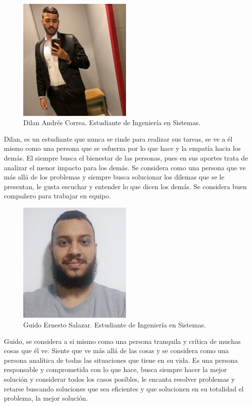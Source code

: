 \begin{figure}[h]
    \centering
    \includegraphics[width=0.50\textwidth]{images/Dilan.jpeg}
    \caption{Dilan Andrés Correa. Estudiante de Ingeniería en Sistemas.}
    \label{Dilan}
\end{figure}

Dilan, es un estudiante que nunca se rinde para realizar sus tareas, se ve a él mismo como una persona que se esfuerza por lo que hace y la empatía hacia los demás. El siempre busca el bienestar de las personas, pues en sus aportes trata de analizar el menor impacto para los demás. Se considera como una persona que ve más allá de los problemas y siempre busca solucionar los dilemas que se le presentan, le gusta escuchar y entender lo que dicen los demás. Se considera buen compañero para trabajar en equipo.

\pagebreak

\begin{figure}[h]
    \centering
    \includegraphics[width=0.50\textwidth]{images/Guido.jpeg}
    \caption{Guido Ernesto Salazar. Estudiante de Ingeniería en Sistemas.}
    \label{Guido}
\end{figure}

Guido, se considera a si mismo como una persona tranquila y crítica de muchas cosas que él ve. Siente que ve más allá de las cosas y se considera como una persona analítica de todas las situaciones que tiene en su vida. Es una persona responsable y comprometida con lo que hace, busca siempre hacer la mejor solución y considerar todos los casos posibles, le encanta resolver problemas y retarse buscando soluciones que sea eficientes y que solucionen en su totalidad el problema, la mejor solución.

